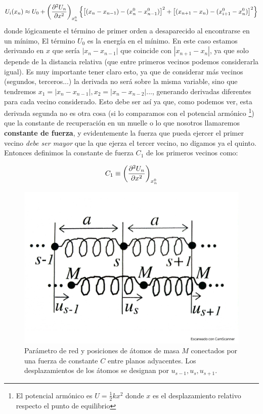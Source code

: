 \begin{equation}
	U_i (x_n)  \approx U_0 +  \left( \frac{\partial ^2U_n}{\partial x^2} \right)_{x_n^0} \left\lbrace \left[  (x_n-x_{n-1}) - (x_n^0-x_{n-1}^0)  \right]^2 +\left[  (x_{n+1}-x_{n}) - (x_{i+1}^0-x_{n}^0)  \right]^2 \right\rbrace  \label{Ec:04-01-04}
\end{equation}
donde lógicamente el término de primer orden a desaparecido al encontrarse en un mínimo, El término $U_0$ es la energía en el mínimo. En este caso estamos derivando en $x$ que sería $|x_n-x_{n-1}|$ que coincide con $|x_{n+1}-x_{n}|$, ya que solo depende de la distancia relativa (que entre primeros vecinos podemos considerarla igual). Es muy importante tener claro esto, ya que de considerar más vecinos (segundos, terceros...) la derivada no será sobre la misma variable, sino que tendremos $x_1=|x_n-x_{n-1}|,x_2=|x_n-x_{n-2}|...$, generando derivadas diferentes para cada vecino considerado. Esto debe ser así ya que, como podemos ver, esta derivada segunda no es otra cosa (si lo comparamos con el potencial armónico \footnote{El potencial armónico es $U=\frac{1}{2}kx^2$ donde $x$ es el  desplazamiento relativo respecto el punto de equilibrio}) que la constante de recuperación en un muelle o lo que nosotros llamaremos \textbf{constante de fuerza}, y evidentemente la fuerza que pueda ejercer el primer vecino \textit{debe ser mayor} que la que ejerza el tercer vecino, no digamos ya el quinto. Entonces definimos la constante de fuerza $C_1$ de los primeros vecinos como:

\begin{equation}
	C_1 \equiv \left( \frac{\partial ^2U_n}{\partial x^2} \right)_{x_n^0}
\end{equation}

\begin{figure}[h!] \centering
\includegraphics[scale=0.35]{Cuerpo/Ch_04/Fotos libro 1.pdf}
\caption{Parámetro de red y posiciones de átomos de masa $M$ conectados por una fuerza de constante $C$ entre planos adyacentes. Los desplazamientos de los átomos se designan por $u_{s-1},u_{s},u_{s+1}$.}
\label{Fig:04-01}
\end{figure}    

